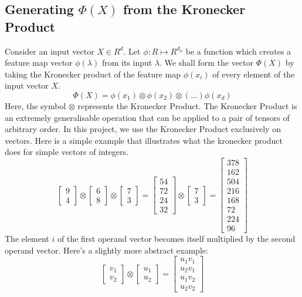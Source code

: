 \documentclass{article}
\theoremstyle{definition}
\theoremstyle{definition}
\begin{document}
\subsection{Generating $\Phi(X)$ from the Kronecker Product}
Consider an input vector $X \in R^d$. Let $\phi : R \mapsto R^{d_{\phi}}$ be a function which creates a feature map vector $\phi(\lambda)$ from its input $\lambda$.  We shall form the vector $\Phi(X)$ by taking the Kronecker product of the feature map $\phi(x_i)$ of every element of the input vector $X$.
\begin{equation}
    \Phi(X) = \phi(x_1) \otimes  \phi(x_2) 
                \otimes (\dots) \phi(x_d)
\end{equation}
Here, the symbol $\otimes$ represents the Kronecker Product. The Kronecker Product is an extremely generalisable operation that can be applied to a pair of tensors of arbitrary order. In this project, we use the Kronecker Product exclusively on vectors. Here is a simple example that illustrates what the kronecker product does for simple vectors of integers.
\[
\begin{bmatrix}
    9 \\ 4
\end{bmatrix}
\otimes
\begin{bmatrix}
    6 \\ 8
\end{bmatrix}
\otimes
\begin{bmatrix}
    7 \\ 3
\end{bmatrix}
=
\begin{bmatrix}
    54 \\ 72 \\ 24 \\ 32
\end{bmatrix}
\otimes
\begin{bmatrix}
    7 \\ 3
\end{bmatrix}
=
\begin{bmatrix}
    378 \\ 162\\ 504 \\216\\ 168\\ 72\\ 224\\ 96
\end{bmatrix}
\]
The element $i$ of the first operand vector becomes itself multiplied by the second operand vector. Here's a slightly more abstract example:
\[
    \begin{bmatrix}
        v_1 \\ v_2
    \end{bmatrix}
    \otimes
    \begin{bmatrix}
        u_1 \\ u_2
    \end{bmatrix}
    =
    \begin{bmatrix}
        u_1 v_1 \\ u_2 v_1 \\ u_1v_2 \\ u_2v_2
    \end{bmatrix}
\]
\end{document}
